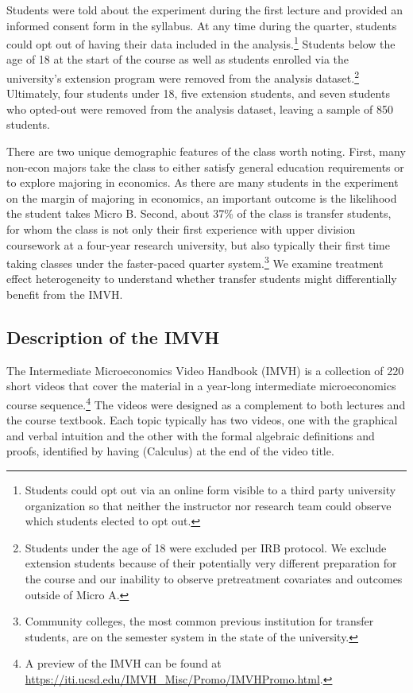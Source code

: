 \documentclass[12pt]{article}
\begin{document}
Students were told about the experiment during the first lecture and provided an informed consent form in the syllabus. At any time during the quarter, students could opt out of having their data included in the analysis.\footnote{Students could opt out via an online form visible to a third party university organization so that neither the instructor nor research team could observe which students elected to opt out.} Students below the age of 18 at the start of the course as well as students enrolled via the university's extension program were removed from the analysis dataset.\footnote{Students under the age of 18 were excluded per IRB protocol. We exclude extension students because of their potentially very different preparation for the course and our inability to observe pretreatment covariates and outcomes outside of Micro A.} Ultimately, four students under 18, five extension students, and seven students who opted-out were removed from the analysis dataset, leaving a sample of 850 students.

There are two unique demographic features of the class worth noting. First, many non-econ majors take the class to either satisfy general education requirements or to explore majoring in economics. As there are many students in the experiment on the margin of majoring in economics, an important outcome is the likelihood the student takes Micro B. Second, about 37\% of the class is transfer students, for whom the class is not only their first experience with upper division coursework at a four-year research university, but also typically their first time taking classes under the faster-paced quarter system.\footnote{Community colleges, the most common previous institution for transfer students, are on the semester system in the state of the university.} We examine treatment effect heterogeneity to understand whether transfer students might differentially benefit from the IMVH.

\subsection{Description of the IMVH}

The Intermediate Microeconomics Video Handbook (IMVH) is a collection of 220 short videos that cover the material in a year-long intermediate microeconomics course sequence.\footnote{A preview of the IMVH can be found at \url{https://iti.ucsd.edu/IMVH_Misc/Promo/IMVHPromo.html}.} The videos were designed as a complement to both lectures and the course textbook.  Each topic typically has two videos, one with the graphical and verbal intuition and the other with the formal algebraic definitions and proofs, identified by having (Calculus) at the end of the video title.
\end{document}
